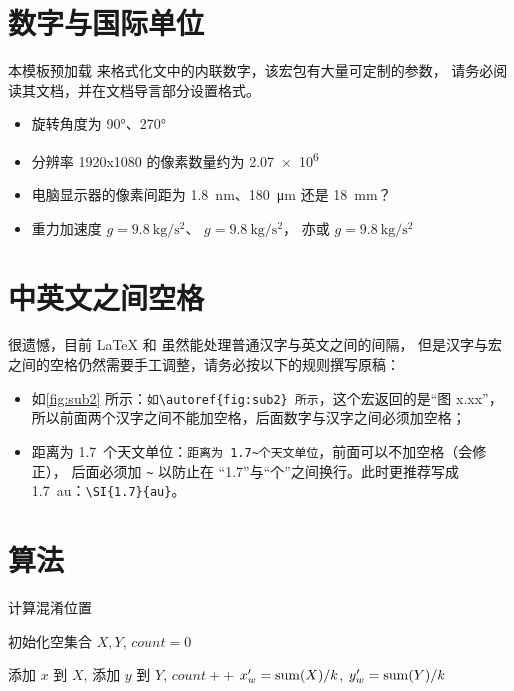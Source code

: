 \section{数字与国际单位}

本模板预加载  来格式化文中的内联数字，该宏包有大量可定制的参数，
请务必阅读其文档，并在文档导言部分设置格式。

\begin{itemize}
  \item 旋转角度为 \ang{90}、\ang{270}
  \item 分辨率 1920x1080 的像素数量约为 \num{2.07e6}
  \item 电脑显示器的像素间距为 \SI{1.8}{\nm}、\SI{180}{\um} 还是 \SI{18}{\mm}？
  \item 重力加速度 $g=\SI{9.8}{\kg\per\square\second}$、
  $g=\SI[inter-unit-product=\ensuremath{{}\cdot{}}]{9.8}{\kg\per\square\second}$，
  亦或 $g=\SI[per-mode=symbol]{9.8}{\kg\per\square\second}$
\end{itemize}

\section{中英文之间空格}

很遗憾，目前 \LaTeX{} 和 \CTeX{} 虽然能处理普通汉字与英文之间的间隔，
但是汉字与宏之间的空格仍然需要手工调整，请务必按以下的规则撰写原稿：
\begin{itemize}
  \item[\ding{51}] 如\autoref{fig:sub2} 所示：\verb|如\autoref{fig:sub2} 所示|，这个宏返回的是“图 x.xx”，
  所以前面两个汉字之间不能加空格，后面数字与汉字之间必须加空格；
  \item[\ding{51}] 距离为 1.7~个天文单位：\verb|距离为 1.7~个天文单位|，前面可以不加空格（\CTeX 会修正），
  后面必须加 \verb|~| 以防止在 “1.7”与“个”之间换行。此时更推荐写成 \SI{1.7}{au}：\verb|\SI{1.7}{au}|。
\end{itemize}

\section{算法}

\begin{algorithm}[!htb]
    \caption{计算混淆位置}
    \label{Alg:CalculateConfusedLocation}
    初始化空集合 $X, Y$, $count=0$

      {
        添加 $x$ 到 $X$, 添加 $y$ 到 $Y$, $count++$
    }
    $x_w^\prime={\rm sum}(X)/k$, $y_w^\prime={\rm sum}(Y)/k$

\end{algorithm}